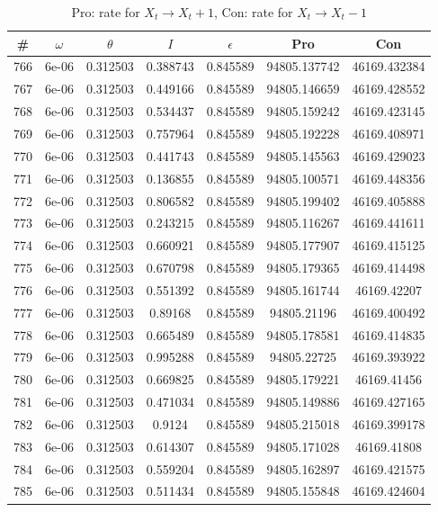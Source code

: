 \newpage
\begin{table}
\caption{Pro: rate for $X_t \rightarrow X_t + 1$, Con: rate for $X_t \rightarrow X_t - 1$}
\begin{tabular*}{\linewidth}{c|c|c|c|c|c|c}
\# & $\omega$ & $\theta$ & $I$ & $\epsilon$ & Pro & Con \\
\hline
766 & 6e-06 & 0.312503 & 0.388743 & 0.845589 & 94805.137742 & 46169.432384\\
767 & 6e-06 & 0.312503 & 0.449166 & 0.845589 & 94805.146659 & 46169.428552\\
768 & 6e-06 & 0.312503 & 0.534437 & 0.845589 & 94805.159242 & 46169.423145\\
769 & 6e-06 & 0.312503 & 0.757964 & 0.845589 & 94805.192228 & 46169.408971\\
770 & 6e-06 & 0.312503 & 0.441743 & 0.845589 & 94805.145563 & 46169.429023\\
771 & 6e-06 & 0.312503 & 0.136855 & 0.845589 & 94805.100571 & 46169.448356\\
772 & 6e-06 & 0.312503 & 0.806582 & 0.845589 & 94805.199402 & 46169.405888\\
773 & 6e-06 & 0.312503 & 0.243215 & 0.845589 & 94805.116267 & 46169.441611\\
774 & 6e-06 & 0.312503 & 0.660921 & 0.845589 & 94805.177907 & 46169.415125\\
775 & 6e-06 & 0.312503 & 0.670798 & 0.845589 & 94805.179365 & 46169.414498\\
776 & 6e-06 & 0.312503 & 0.551392 & 0.845589 & 94805.161744 & 46169.42207\\
777 & 6e-06 & 0.312503 & 0.89168 & 0.845589 & 94805.21196 & 46169.400492\\
778 & 6e-06 & 0.312503 & 0.665489 & 0.845589 & 94805.178581 & 46169.414835\\
779 & 6e-06 & 0.312503 & 0.995288 & 0.845589 & 94805.22725 & 46169.393922\\
780 & 6e-06 & 0.312503 & 0.669825 & 0.845589 & 94805.179221 & 46169.41456\\
781 & 6e-06 & 0.312503 & 0.471034 & 0.845589 & 94805.149886 & 46169.427165\\
782 & 6e-06 & 0.312503 & 0.9124 & 0.845589 & 94805.215018 & 46169.399178\\
783 & 6e-06 & 0.312503 & 0.614307 & 0.845589 & 94805.171028 & 46169.41808\\
784 & 6e-06 & 0.312503 & 0.559204 & 0.845589 & 94805.162897 & 46169.421575\\
785 & 6e-06 & 0.312503 & 0.511434 & 0.845589 & 94805.155848 & 46169.424604\\

\end{tabular*}
\end{table}
